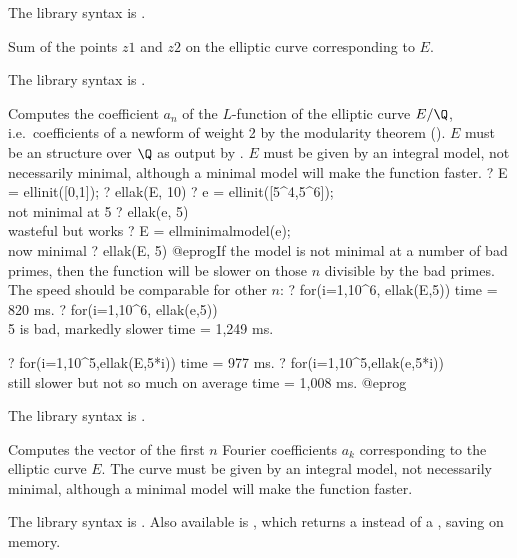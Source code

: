 The library syntax is .

\label{se:elladd}
Sum of the points $z1$ and $z2$ on the
elliptic curve corresponding to $E$.

The library syntax is .

\label{se:ellak}
Computes the coefficient $a_n$ of the $L$-function of the elliptic curve
$E/\Q$, i.e.~coefficients of a newform of weight 2 by the modularity theorem
(). $E$ must be an  structure
over $\Q$ as output by . $E$ must be given by an integral model,
not necessarily minimal, although a minimal model will make the function
faster.
\bprog
? E = ellinit([0,1]);
? ellak(E, 10)
? e = ellinit([5^4,5^6]); \\ not minimal at 5
? ellak(e, 5) \\ wasteful but works
? E = ellminimalmodel(e); \\ now minimal
? ellak(E, 5)
@eprog\noindent If the model is not minimal at a number of bad primes, then
the function will be slower on those $n$ divisible by the bad primes.
The speed should be comparable for other $n$:
\bprog
? for(i=1,10^6, ellak(E,5))
time = 820 ms.
? for(i=1,10^6, ellak(e,5)) \\ 5 is bad, markedly slower
time = 1,249 ms.

? for(i=1,10^5,ellak(E,5*i))
time = 977 ms.
? for(i=1,10^5,ellak(e,5*i)) \\ still slower but not so much on average
time = 1,008 ms.
@eprog

The library syntax is .

\label{se:ellan}
Computes the vector of the first $n$ Fourier coefficients $a_k$
corresponding to the elliptic curve $E$. The curve must be given by an
integral model, not necessarily minimal, although a minimal model will make
the function faster.

The library syntax is .
Also available is , which
returns a  instead of a , saving on memory.

